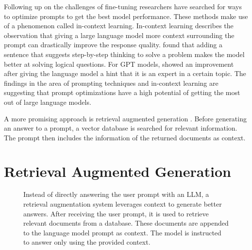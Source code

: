 \documentclass[../main.tex]{subfiles}
\begin{document}
Following up on the challenges of fine-tuning researchers have searched for ways to optimize prompts to get the best model performance.
These methods make use of a phenomenon called in-context learning.
In-context learning describes the observation that giving a large language model more context surrounding the prompt can drastically improve the response quality.
\cite{Wei2022} found that adding a sentence that suggests step-by-step thinking to solve a problem makes the model better at solving logical questions.
For GPT models, \autocite{Xu2023} showed an improvement after giving the language model a hint that it is an expert in a certain topic.
The findings in the area of prompting techniques and in-context learning are suggesting
that prompt optimizations have a high potential of getting the most out of large language models.

A more promising approach is retrieval augmented generation \cite{Lewis2020}.
Before generating an answer to a prompt, a vector database is searched for relevant information.
The prompt then includes the information of the returned documents as context.

\section{Retrieval Augmented Generation}

\begin{figure}[t]
    \centering
    \caption{Instead of directly answering the user prompt with an LLM,
        a retrieval augmentation system leverages context to generate better answers.
        After receiving the user prompt, it is used to retrieve relevant documents from a database.
        These documents are appended to the language model prompt as context.
        The model is instructed to answer only using the provided context.}
    \label{fig:rag_flowchart}
\end{figure}
\end{document}
